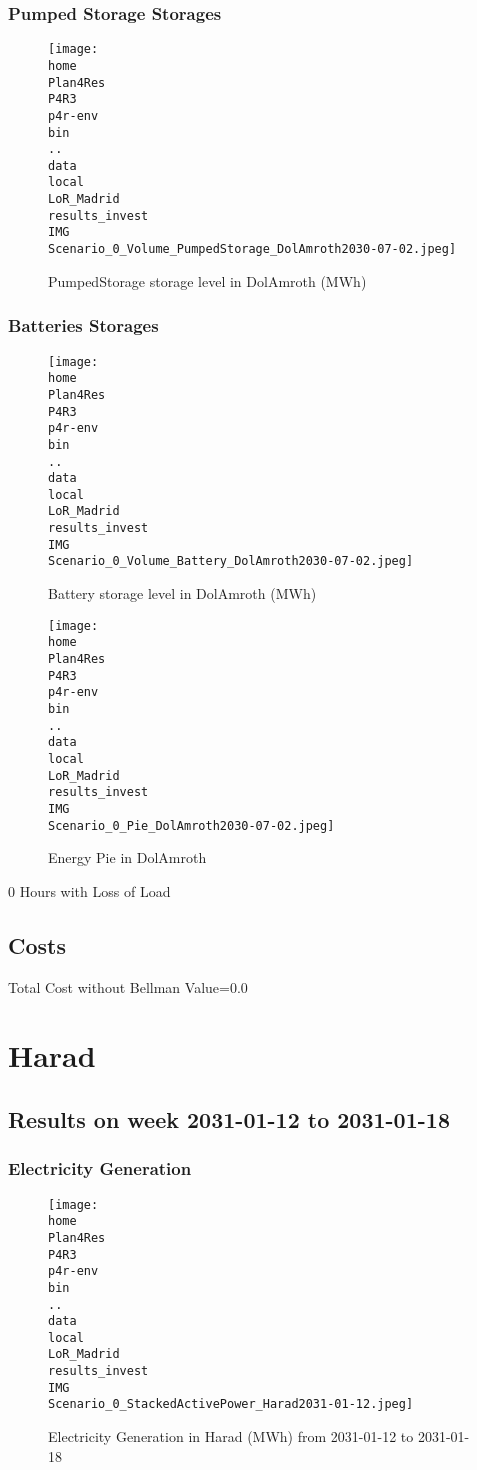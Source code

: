 \documentclass[10pt]{report}
\begin{document}
\subsubsection{Pumped Storage Storages}
\begin{figure}[H]
\centering
\texttt{[image: \\home\\Plan4Res\\P4R3\\p4r-env\\bin\\..\\data\\local\\LoR\_Madrid\\results\_invest\\IMG\\Scenario\_0\_Volume\_PumpedStorage\_DolAmroth2030-07-02.jpeg]}
\caption{PumpedStorage storage level in DolAmroth (MWh)}
\label{fig:Scenario_0_Volume_PumpedStorage_DolAmroth2030-07-02.jpeg}
\end{figure}
\subsubsection{Batteries Storages}
\begin{figure}[H]
\centering
\texttt{[image: \\home\\Plan4Res\\P4R3\\p4r-env\\bin\\..\\data\\local\\LoR\_Madrid\\results\_invest\\IMG\\Scenario\_0\_Volume\_Battery\_DolAmroth2030-07-02.jpeg]}
\caption{Battery storage level in DolAmroth (MWh)}
\label{fig:Scenario_0_Volume_Battery_DolAmroth2030-07-02.jpeg}
\end{figure}
\begin{figure}[H]
\centering
\texttt{[image: \\home\\Plan4Res\\P4R3\\p4r-env\\bin\\..\\data\\local\\LoR\_Madrid\\results\_invest\\IMG\\Scenario\_0\_Pie\_DolAmroth2030-07-02.jpeg]}
\caption{Energy Pie in DolAmroth}
\label{fig:Scenario_0_Pie_DolAmroth2030-07-02.jpeg}
\end{figure}
0 Hours with Loss of Load

\subsection{Costs}

Total Cost without Bellman Value=0.0
\newpage\section{Harad}
\subsection{Results on week 2031-01-12 to 2031-01-18}
\subsubsection{Electricity Generation}
\begin{figure}[H]
\centering
\texttt{[image: \\home\\Plan4Res\\P4R3\\p4r-env\\bin\\..\\data\\local\\LoR\_Madrid\\results\_invest\\IMG\\Scenario\_0\_StackedActivePower\_Harad2031-01-12.jpeg]}
\caption{Electricity Generation in Harad (MWh) from 2031-01-12 to 2031-01-18}
\label{fig:Scenario_0_StackedActivePower_Harad2031-01-12.jpeg}
\end{figure}
\end{document}
